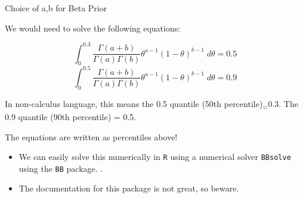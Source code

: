 \documentclass[
  ignorenonframetext,
]{beamer}
\begin{document}
\begin{frame}{Choice of a,b for Beta Prior}
\protect\hypertarget{choice-of-ab-for-beta-prior-1}{}

We would need to solve the following equations:

\[\int_{0}^{0.3} \frac{\Gamma(a+b)}{\Gamma(a)\Gamma(b)}
\theta^{a-1}(1-\theta)^{b-1}\;d\theta = 0.5\]
\[\int_{0}^{0.5} \frac{\Gamma(a+b)}{\Gamma(a)\Gamma(b)}
\theta^{a-1}(1-\theta)^{b-1}\;d\theta = 0.9\]

In non-calculus language, this means the 0.5 quantile (50th
percentile)\textsubscript{=}0.3. The 0.9 quantile (90th percentile) =
0.5.

The equations are written as percentiles above!

\begin{itemize}
\item We can easily solve this numerically in \texttt{R} using a numerical solver \texttt{BBsolve} using the \texttt{BB} package. . 
\item The documentation for this package is not great, so beware.
\end{itemize}

\end{frame}
\end{document}
